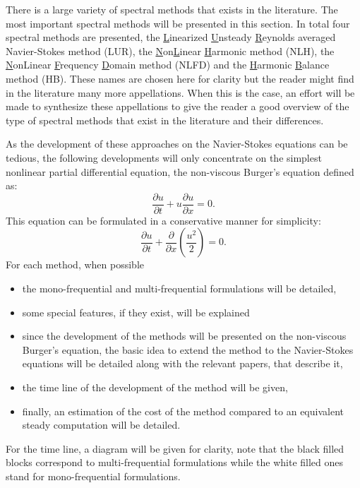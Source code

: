 
There is a large variety of spectral methods that exists in the
literature. 
The most important spectral methods will be presented in this section.
In total four spectral methods are presented, 
the \underline{L}inearized \underline{U}nsteady 
\underline{R}eynolds averaged
Navier-Stokes method (LUR), 
the \underline{N}on\underline{L}inear 
\underline{H}armonic method (NLH), the \underline{N}onLinear 
\underline{F}requency \underline{D}omain
method (NLFD) and the \underline{H}armonic \underline{B}alance 
method (HB).
These names are chosen here
for clarity but the reader might find in the literature many more
appellations. When this is the case, an effort will be made to synthesize
these appellations to give the reader a good 
overview of the type of spectral methods that exist in the literature
and their differences.

As the development of these approaches on the Navier-Stokes equations
can be tedious, the following developments 
will only concentrate on the simplest
nonlinear partial differential equation, 
the non-viscous Burger's equation defined as:
\begin{equation}
	\frac{\partial u}{\partial t} + 
	u \frac{\partial u}{\partial x} = 
	0.
	\label{eq:sm_nonlinear_convection}
\end{equation}
This equation can be formulated in a conservative manner for simplicity:
\begin{equation}
	\frac{\partial u}{\partial t} + 
	\frac{\partial}{\partial x} \left( \frac{u^2}{2} \right) = 
	0.
	\label{eq:sm_nonlinear_convection_conservative}
\end{equation}
For each method, when possible
\begin{itemize} \itemsep0pt \parskip0pt
 	\item the mono-frequential and multi-frequential 
 	formulations will be detailed,
 	\item some special features, if they exist, will be explained
 	\item since the development of the methods will be 
 	presented on the non-viscous 
 	Burger's equation, 
	the basic idea to extend the method to the Navier-Stokes
	equations will be detailed along with the relevant papers,
	that describe it,
	\item the time line of the development 
	of the method will be given,
	\item finally, an estimation of the cost of the method 
	compared to an equivalent steady computation will be detailed.
\end{itemize}
For the time line, a diagram will be given for clarity, note
that the black filled blocks correspond to multi-frequential
formulations while the white filled ones stand for mono-frequential
formulations.
